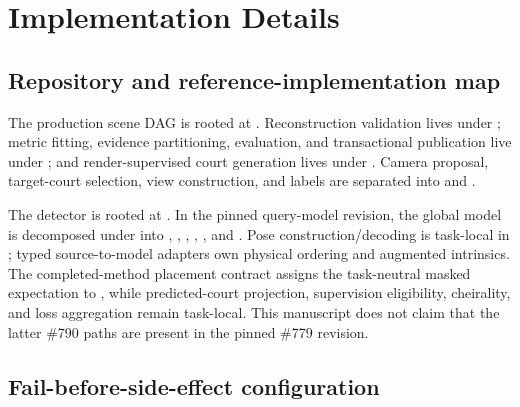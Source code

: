 \section{Implementation Details}
\label{app:implementation}

\subsection{Repository and reference-implementation map}

The production scene DAG is rooted at
.  Reconstruction validation lives under
; metric fitting, evidence
partitioning, evaluation, and transactional publication live under
; and render-supervised court
generation lives under
.  Camera proposal,
target-court selection, view construction, and labels are separated into
and
.

The detector is rooted at .  In the pinned
query-model revision, the global model is decomposed under
 into
, , ,
, , and .  Pose
construction/decoding is task-local in
; typed source-to-model adapters
own physical ordering and augmented intrinsics.  The completed-method placement
contract assigns the task-neutral masked expectation to
, while predicted-court projection,
supervision eligibility, cheirality, and loss aggregation remain task-local.
This manuscript does not claim that the latter \#790 paths are present in the
pinned \#779 revision.

\subsection{Fail-before-side-effect configuration}

